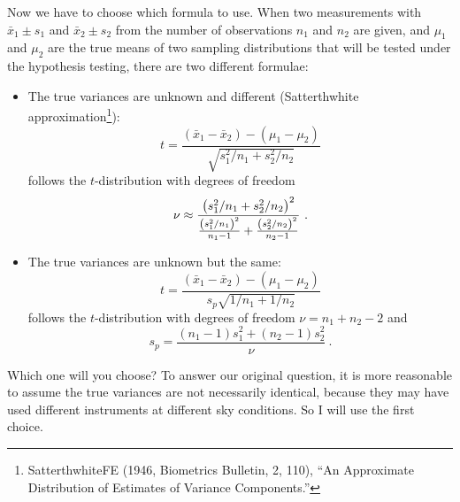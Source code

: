 Now we have to choose which formula to use. When two measurements with $ \bar{x}_1 \pm s_1 $ and $ \bar{x}_2 \pm s_2 $ from the number of observations $ n_1 $ and $ n_2 $ are given, and $ \mu_1 $ and $ \mu_2 $ are the true means of two sampling distributions that will be tested under the hypothesis testing, there are two different formulae:
\begin{itemize}
\item The true variances are unknown and different (Satterthwhite approximation\footnote{SatterthwhiteFE (1946, Biometrics Bulletin, 2, 110), ``An Approximate Distribution of Estimates of Variance Components.''}):
\begin{equation}
  t = \frac{(\bar{x}_1 - \bar{x}_2) - (\mu_1 - \mu_2) }{\sqrt{s_1^2 / n_1 + s_2^2 / n_2}}
\end{equation}
follows the $ t $-distribution with degrees of freedom
\begin{equation}
  \nu \approx 
    \frac{\qty( s_1^2 / n_1 + s_2^2 / n_2 )^2}
    {\frac{ \qty(s_1^2 / n_1)^2 }{n_1 - 1}
      + \frac{ \qty(s_2^2 / n_2)^2 }{n_2 - 1}} ~.
\end{equation}
\item The true variances are unknown but the same:
\begin{equation}
  t = \frac{(\bar{x}_1 - \bar{x}_2) - (\mu_1 - \mu_2) }{s_p \sqrt{1 / n_1 + 1 / n_2}}
\end{equation}
follows the $ t $-distribution with degrees of freedom $ \nu = n_1 + n_2 - 2 $ and
\begin{equation}
  s_p = \frac{(n_1 - 1) s_1^2 + (n_2 - 1) s_2^2}{\nu} ~.
\end{equation}
\end{itemize}
Which one will you choose? To answer our original question, it is more reasonable to assume the true variances are not necessarily identical, because they may have used different instruments at different sky conditions. So I will use the first choice.

